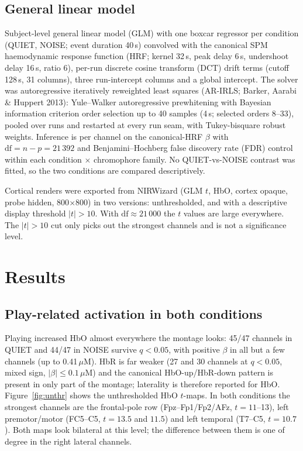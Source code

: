 \documentclass[11pt,a4paper]{article}
\begin{document}
\subsection{General linear model}
Subject-level general linear model (GLM) with one boxcar regressor per
condition (QUIET, NOISE; event duration 40\,s) convolved with the canonical
SPM haemodynamic response function (HRF; kernel 32\,s, peak delay 6\,s,
undershoot delay 16\,s, ratio 6), per-run discrete cosine transform (DCT)
drift terms (cutoff 128\,s, 31 columns), three run-intercept columns and a
global intercept. The solver was autoregressive iteratively reweighted least
squares (AR-IRLS;
Barker, Aarabi \& Huppert 2013): Yule--Walker autoregressive prewhitening
with Bayesian information criterion order selection up to 40 samples (4\,s;
selected orders 8--33), pooled over runs and restarted at every run seam, with
Tukey-bisquare robust weights. Inference is per channel on the canonical-HRF
$\beta$ with $\mathrm{df}=n-p=21\,392$ and Benjamini--Hochberg false discovery
rate (FDR) control within each condition $\times$ chromophore family. No
QUIET-vs-NOISE contrast was fitted, so the two conditions are compared
descriptively.

Cortical renders were exported from NIRWizard (GLM $t$, HbO, cortex opaque,
probe hidden, 800$\times$800) in two versions: unthresholded, and with a
descriptive display threshold $|t|>10$. With $\mathrm{df}\approx 21\,000$ the
$t$ values are large everywhere. The $|t|>10$ cut only picks out the
strongest channels and is not a significance level.

\section{Results}

\subsection{Play-related activation in both conditions}
Playing increased HbO almost everywhere the montage looks: 45/47 channels in
QUIET and 44/47 in NOISE survive $q<0.05$, with positive $\beta$ in all but a
few channels (up to 0.41\,$\mu$M). HbR is far weaker (27 and 30 channels at
$q<0.05$, mixed sign, $|\beta|\le0.1\,\mu$M) and the canonical HbO-up/HbR-down
pattern is present in only part of the montage; laterality is therefore
reported for HbO. Figure~\ref{fig:unthr} shows the unthresholded HbO $t$-maps.
In both conditions the strongest channels are the frontal-pole row
(Fpz--Fp1/Fp2/AFz, $t=11$--13), left premotor/motor (FC5--C5, $t=13.5$ and
$11.5$) and left temporal (T7--C5, $t=10.7$). Both maps look bilateral at this
level; the difference between them is one of degree in the right lateral
channels.
\end{document}

